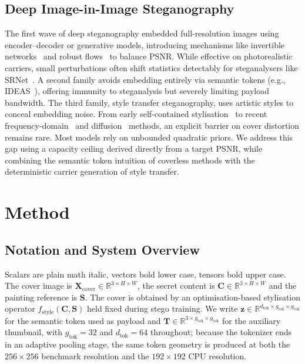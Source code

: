 \documentclass[conference]{IEEEtran}
\begin{document}
\subsection{Deep Image-in-Image Steganography}
The first wave of deep steganography embedded full-resolution images using encoder--decoder or generative models, introducing mechanisms like invertible networks~\cite{isn} and robust flows~\cite{riis} to balance PSNR. While effective on photorealistic carriers, small perturbations often shift statistics detectably for steganalysers like SRNet~\cite{srnet}. A second family avoids embedding entirely via semantic tokens (e.g., IDEAS~\cite{ideas2022}), offering immunity to steganalysis but severely limiting payload bandwidth. The third family, style transfer steganography, uses artistic styles to conceal embedding noise. From early self-contained stylisation~\cite{wacv2020} to recent frequency-domain~\cite{quat2021} and diffusion~\cite{sddpm2025} methods, an explicit barrier on cover distortion remains rare. Most models rely on unbounded quadratic priors. We address this gap using a capacity ceiling derived directly from a target PSNR, while combining the semantic token intuition of coverless methods with the deterministic carrier generation of style transfer.

\section{Method}
\label{sec:method}

\subsection{Notation and System Overview}
Scalars are plain math italic, vectors bold lower case, tensors bold upper case. The cover image is $\mathbf{X}_{\text{cover}}\!\in\!\mathbb{R}^{3\times H\times W}$, the secret content is $\mathbf{C}\!\in\!\mathbb{R}^{3\times H\times W}$ and the painting reference is $\mathbf{S}$. The cover is obtained by an optimisation-based stylisation operator $f_{\text{style}}(\mathbf{C},\mathbf{S})$ held fixed during stego training. We write $\mathbf{z}\!\in\!\mathbb{R}^{d_{\text{tok}}\times g_{\text{tok}}\times g_{\text{tok}}}$ for the semantic token used as payload and $\mathbf{T}\!\in\!\mathbb{R}^{3\times g_{\text{tok}}\times g_{\text{tok}}}$ for the auxiliary thumbnail, with $g_{\text{tok}}=32$ and $d_{\text{tok}}=64$ throughout; because the tokenizer ends in an adaptive pooling stage, the same token geometry is produced at both the $256\!\times\!256$ benchmark resolution and the $192\!\times\!192$ CPU resolution.
\end{document}
